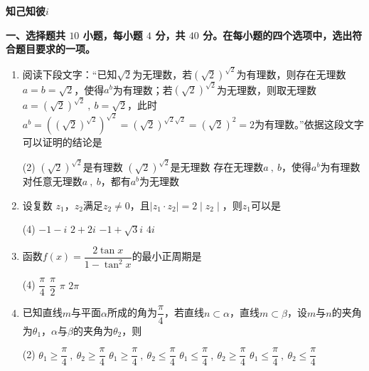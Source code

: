 \documentclass[11pt,a4paper]{ctexart}
\newcommand{\sectiontitle}[1]{
  \par\noindent\textbf{#1}\par%
  }
\newcounter{chapPage}
\begin{document}
\clearpage %
\setcounter{enumi}{0}   %
{} %
\setcounter{chapPage}{1} %

\begin{center} 
    {\LARGE \textbf{知己知彼$i$}}\\[1em]
\end{center}

\sectiontitle{一、选择题共 $10$ 小题，每小题 $4$ 分，共 $40$ 分。在每小题的四个选项中，选出符合题目要求的一项。}

\begin{enumerate}

    \item 阅读下段文字：“已知$\sqrt{2}$为无理数，若$(\sqrt{2})^{\sqrt{2}}$为有理数，则存在无理数$a=b=\sqrt{2}$，使得$a^b$为有理数；若$(\sqrt{2})^{\sqrt{2}}$为无理数，则取无理数$a=(\sqrt{2})^{\sqrt{2}}\ ,\ b=\sqrt{2}$，此时$a^b=((\sqrt{2})^{\sqrt{2}})^{\sqrt{2}}=(\sqrt{2})^{\sqrt{2}\sqrt{2}}=(\sqrt{2})^2=2$为有理数。”依据这段文字可以证明的结论是
    \begin{tasks}(2)
        \task $(\sqrt{2})^{\sqrt{2}}$是有理数 
        \task $(\sqrt{2})^{\sqrt{2}}$是无理数
        \task 存在无理数$a\ ,\ b$，使得$a^b$为有理数
        \task 对任意无理数$a\ ,\ b$，都有$a^b$为无理数
    \end{tasks}

    \item 设复数 $z_1$，$z_2$满足$z_2\neq0$，且$\mid z_1 \cdot z_2 \mid=2 \mid z_2 \mid$，则$z_1$可以是
    \begin{tasks}(4)
        \task $-1-i$ 
        \task $2+2i$
        \task $-1+\sqrt{3}i$
        \task $4i$
    \end{tasks}

    \item 函数$f(x)= \dfrac{2\tan x}{1-\tan ^2 x}$的最小正周期是
    \begin{tasks}(4)
        \task $\dfrac{\pi}{4}$ 
        \task $\dfrac{\pi}{2}$
        \task $\pi$
        \task $2\pi$
    \end{tasks}

    \item 已知直线$m$与平面$\alpha$所成的角为$\dfrac{\pi}{4}$，若直线$n \subset \alpha$，直线$m \subset \beta$，设$m$与$n$的夹角为$\theta_1$，$\alpha$与$\beta$的夹角为$\theta_2$，则
    \begin{tasks}(2)
        \task $\theta_1 \ge \dfrac{\pi}{4}\ ,\ \theta_2 \ge \dfrac{\pi}{4} $
        \task $\theta_1 \ge \dfrac{\pi}{4}\ ,\ \theta_2 \le \dfrac{\pi}{4} $
        \task $\theta_1 \le \dfrac{\pi}{4}\ ,\ \theta_2 \ge \dfrac{\pi}{4} $
        \task $\theta_1 \le \dfrac{\pi}{4}\ ,\ \theta_2 \le \dfrac{\pi}{4} $
    \end{tasks}
    

\end{enumerate}
\end{document}

